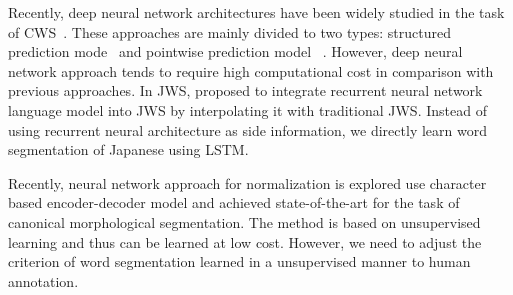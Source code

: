 \documentclass[11pt,letterpaper]{article}
\begin{document}

Recently, deep neural network architectures have been widely studied in the task of CWS~\cite{chen-EtAl:2015:EMNLP2,chen-EtAl:2015:ACL-IJCNLP5,pei-ge-chang:2014:P14-1,zhang-zhang-fu:2016:P16-1,cai-zhao:2016:P16-1}. These approaches are mainly divided to two types: structured prediction mode~\cite{zhang-zhang-fu:2016:P16-1,cai-zhao:2016:P16-1} and pointwise prediction model ~\cite{chen-EtAl:2015:EMNLP2,chen-EtAl:2015:ACL-IJCNLP5,pei-ge-chang:2014:P14-1}. However, deep neural network approach tends to require high computational cost in comparison with previous approaches. 
In JWS,  proposed to integrate recurrent neural network language model into JWS by interpolating it with traditional JWS. Instead of using recurrent neural architecture as side information, we directly learn word segmentation of Japanese using LSTM. 


Recently, neural network approach for normalization is explored \cite{kann-cotterell-schutze:2016:EMNLP2016, ikeda2016norm}  use character based encoder-decoder model and achieved state-of-the-art for the task of canonical
morphological segmentation.
The method is based on unsupervised learning and thus can be learned at low cost. However, we need to  adjust the criterion of word segmentation learned in a unsupervised manner to human annotation.




 
\end{document}
